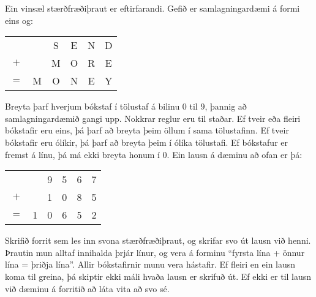 \begin{problem}
	Ein vinsæl stærðfræðiþraut er eftirfarandi. Gefið er samlagningardæmi á formi eins og:
	\begin{center}
		\begin{tabular}{cccccc}
			     &  & S & E & N & D \\
			$+$  &  & M & O & R & E \\
			  \hline
			$=$ & M & O & N & E & Y \\
		\end{tabular}
	\end{center}
	Breyta þarf hverjum bókstaf í tölustaf á bilinu $0$ til $9$, þannig að samlagningardæmið gangi upp. Nokkrar reglur eru til staðar. Ef tveir eða fleiri bókstafir eru eins, þá þarf að breyta þeim öllum í sama tölustafinn. Ef tveir bókstafir eru ólíkir, þá þarf að breyta þeim í ólíka tölustafi. Ef bókstafur er fremst á línu, þá má ekki breyta honum í $0$. Ein lausn á dæminu að ofan er þá:
	\begin{center}
		\begin{tabular}{cccccc}
			     &  & 9 & 5 & 6 & 7 \\
			$+$  &  & 1 & 0 & 8 & 5 \\
			  \hline
			$=$ & 1 & 0 & 6 & 5 & 2 \\
		\end{tabular}
	\end{center}

	Skrifið forrit sem les inn svona stærðfræðiþraut, og skrifar svo út lausn við henni. Þrautin mun alltaf innihalda þrjár línur, og vera á forminu "`fyrsta lína + önnur lína = þriðja lína"'. Allir bókstafirnir munu vera hástafir. Ef fleiri en ein lausn koma til greina, þá skiptir ekki máli hvaða lausn er skrifuð út. Ef ekki er til lausn við dæminu á forritið að láta vita að svo sé.

\begin{example}
%
\end{example}

\begin{example}
%
\end{example}

\begin{example}
%
\end{example}
\end{problem}